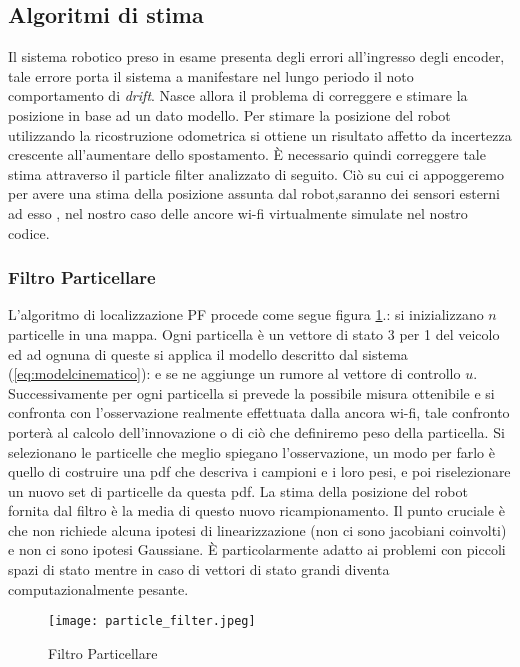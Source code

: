 \subsection{Algoritmi di stima}
Il sistema robotico preso in esame presenta degli errori all'ingresso degli 
encoder, tale errore porta il sistema a manifestare nel lungo periodo il noto 
comportamento di \emph{drift}. Nasce allora il problema di correggere e stimare
la posizione in base ad un dato modello.
Per stimare la posizione del robot utilizzando la ricostruzione 
odometrica si ottiene un risultato affetto da incertezza crescente all'aumentare 
dello spostamento.
È necessario quindi correggere tale stima attraverso il particle filter analizzato di seguito.
Ciò su cui ci appoggeremo per avere una stima della posizione assunta dal robot,saranno
dei sensori esterni ad esso , nel nostro caso delle ancore wi-fi virtualmente simulate nel
nostro codice.
%
\subsubsection{Filtro Particellare}
%
L'algoritmo di localizzazione PF procede come segue figura \ref{fig:particle filter}.: si inizializzano $n$ 
particelle in una mappa.
Ogni particella è un vettore di stato 3 per 1 del veicolo ed ad ognuna di queste 
si applica il modello descritto dal sistema (\ref{eq:modelcinematico}): e se ne aggiunge un rumore al vettore di
controllo $u$. 
Successivamente per ogni particella si prevede la possibile misura ottenibile e si confronta 
con l'osservazione realmente effettuata dalla ancora wi-fi, tale confronto porterà al calcolo 
dell'innovazione o di ciò che definiremo peso della particella.
Si selezionano le particelle che meglio spiegano l'osservazione, un modo per 
farlo è quello di costruire una pdf che descriva i campioni e i loro pesi, e 
poi riselezionare un nuovo set di particelle da questa pdf.
La stima della posizione del robot fornita dal filtro è la media di questo 
nuovo ricampionamento. 
Il punto cruciale è che non richiede alcuna ipotesi di linearizzazione (non ci 
sono jacobiani coinvolti) e non ci sono ipotesi Gaussiane. È particolarmente 
adatto ai problemi con piccoli spazi di stato mentre in caso di vettori di 
stato grandi diventa computazionalmente pesante.

\begin{figure}[!htb]
  \texttt{[image: particle\_filter.jpeg]}
  \caption{Filtro Particellare}
  \label{fig:particle filter}
\end{figure}